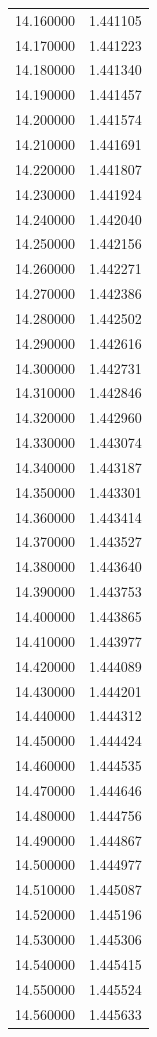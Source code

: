 \begin{tabular}{rr}
14.160000 & 1.441105 \\
14.170000 & 1.441223 \\
14.180000 & 1.441340 \\
14.190000 & 1.441457 \\
14.200000 & 1.441574 \\
14.210000 & 1.441691 \\
14.220000 & 1.441807 \\
14.230000 & 1.441924 \\
14.240000 & 1.442040 \\
14.250000 & 1.442156 \\
14.260000 & 1.442271 \\
14.270000 & 1.442386 \\
14.280000 & 1.442502 \\
14.290000 & 1.442616 \\
14.300000 & 1.442731 \\
14.310000 & 1.442846 \\
14.320000 & 1.442960 \\
14.330000 & 1.443074 \\
14.340000 & 1.443187 \\
14.350000 & 1.443301 \\
14.360000 & 1.443414 \\
14.370000 & 1.443527 \\
14.380000 & 1.443640 \\
14.390000 & 1.443753 \\
14.400000 & 1.443865 \\
14.410000 & 1.443977 \\
14.420000 & 1.444089 \\
14.430000 & 1.444201 \\
14.440000 & 1.444312 \\
14.450000 & 1.444424 \\
14.460000 & 1.444535 \\
14.470000 & 1.444646 \\
14.480000 & 1.444756 \\
14.490000 & 1.444867 \\
14.500000 & 1.444977 \\
14.510000 & 1.445087 \\
14.520000 & 1.445196 \\
14.530000 & 1.445306 \\
14.540000 & 1.445415 \\
14.550000 & 1.445524 \\
14.560000 & 1.445633 \\

\end{tabular}
